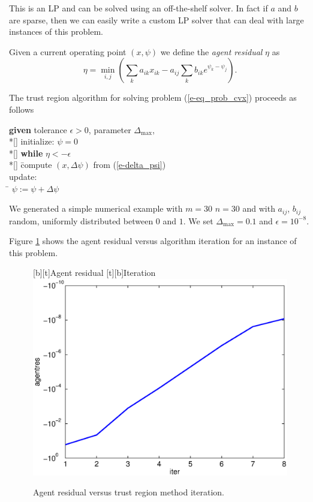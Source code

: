 \documentclass[12pt]{article}
\begin{document}
This is an LP and can be
solved using an off-the-shelf solver. 
In fact if $a$ and $b$ are sparse, then we can easily write
a custom LP solver that can deal with large instances of this problem.

Given a current operating point $(x,\psi)$ we define the
{\em agent residual} $\eta$ as
\[
\eta = \min_{i,j}\left(\sum_k a_{ik} x_{ik} -
 a_{ij} \sum_{k} b_{ik} e^{\psi_k-\psi_j}\right).
\]

The trust region algorithm for solving problem (\ref{e-eq_prob_cvx})
proceeds as follows
\begin{algdesc}
\begin{tabbing}
{\bf given} tolerance $\epsilon >0$, parameter $\Delta_\mathrm{max}$,
\\*[\smallskipamount]
{initialize:} $\psi = 0$
\\*[\smallskipamount]
{\bf while}  $\eta < -\epsilon$\\*[\smallskipamount]
\qquad \= compute $(x,\Delta \psi)$ from (\ref{e-delta_psi})\\
\>update:\\
\> \qquad \= $\psi:= \psi + \Delta \psi$
\end{tabbing}
\end{algdesc}

We generated a simple numerical example with $m = 30$
$n = 30$ and with $a_{ij}$, $b_{ij}$ random,
uniformly distributed between $0$ and $1$.
We set $\Delta_\mathrm{max} = 0.1$ and $\epsilon = 10^{-8}$. 

Figure \ref{f-agent_res} shows the agent residual versus
algorithm iteration for an instance of this problem.

\begin{figure}
\begin{center}
[b][t]{Agent residual}
[t][b]{Iteration}
\includegraphics[width=0.6\linewidth]{matlab/agent_res.eps}
\end{center}
\caption{Agent residual versus trust region method iteration.}
\label{f-agent_res}
\end{figure}
\end{document}
